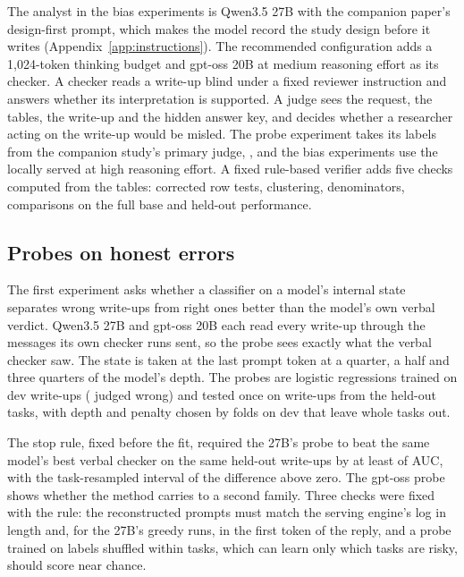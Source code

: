 The analyst in the bias experiments is Qwen3.5 27B with the companion paper's design-first prompt, which makes the model record the study design before it writes (Appendix~\ref{app:instructions}). The recommended configuration adds a 1,024-token thinking budget and gpt-oss 20B at medium reasoning effort as its checker. A checker reads a write-up blind under a fixed reviewer instruction and answers whether its interpretation is supported. A judge sees the request, the tables, the write-up and the hidden answer key, and decides whether a researcher acting on the write-up would be misled. The probe experiment takes its labels from the companion study's primary judge, , and the bias experiments use the locally served  at high reasoning effort. A fixed rule-based verifier adds five checks computed from the tables: corrected row tests, clustering, denominators, comparisons on the full base and held-out performance.

\subsection{Probes on honest errors}
\label{sec:methods-probe}

The first experiment asks whether a classifier on a model's internal state separates wrong write-ups from right ones better than the model's own verbal verdict. Qwen3.5 27B and gpt-oss 20B each read every write-up through the messages its own checker runs sent, so the probe sees exactly what the verbal checker saw. The state is taken at the last prompt token at a quarter, a half and three quarters of the model's depth. The probes are logistic regressions trained on  dev write-ups ( judged wrong) and tested once on  write-ups from the  held-out tasks, with depth and penalty chosen by folds on dev that leave whole tasks out.

The stop rule, fixed before the fit, required the 27B's probe to beat the same model's best verbal checker on the same held-out write-ups by at least  of AUC, with the task-resampled interval of the difference above zero. The gpt-oss probe shows whether the method carries to a second family. Three checks were fixed with the rule: the reconstructed prompts must match the serving engine's log in length and, for the 27B's greedy runs, in the first token of the reply, and a probe trained on labels shuffled within tasks, which can learn only which tasks are risky, should score near chance.

